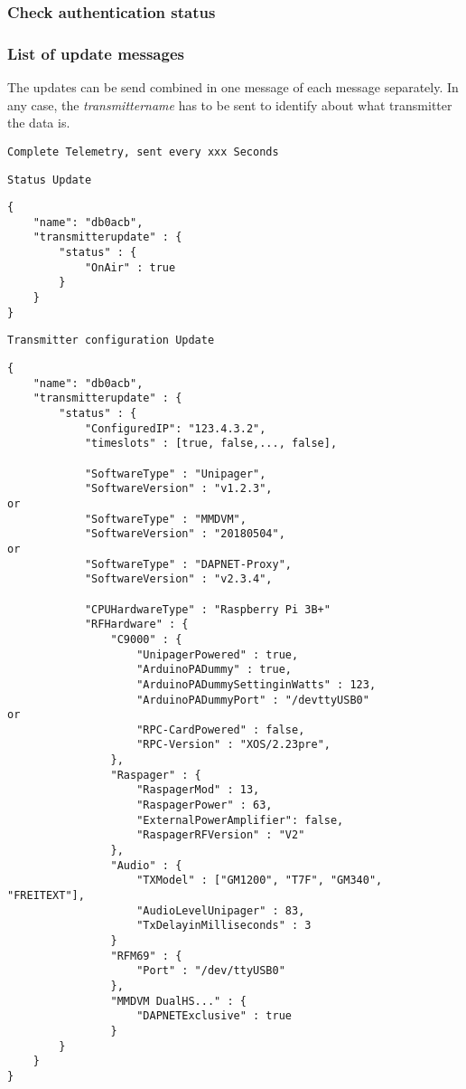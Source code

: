 \documentclass[a4paper]{article}
\begin{document}
\subsubsection{Check authentication status}
 
\subsubsection{List of update messages}
The updates can be send combined in one message of each message separately. In any case, the \textit{transmittername} has to be sent to identify about what transmitter the data is.

\texttt{Complete Telemetry, sent every xxx Seconds}

\texttt{Status Update}
\begin{lstlisting}
{
    "name": "db0acb",
    "transmitterupdate" : {
        "status" : {
            "OnAir" : true
        }
    }
}
\end{lstlisting}

\texttt{Transmitter configuration Update}
\begin{lstlisting}
{
    "name": "db0acb",
	"transmitterupdate" : {
		"status" : {
			"ConfiguredIP": "123.4.3.2",
            "timeslots" : [true, false,...,	false],
            
			"SoftwareType" : "Unipager",
            "SoftwareVersion" : "v1.2.3",
or
			"SoftwareType" : "MMDVM",
			"SoftwareVersion" : "20180504",
or
			"SoftwareType" : "DAPNET-Proxy",
			"SoftwareVersion" : "v2.3.4",
            
			"CPUHardwareType" : "Raspberry Pi 3B+"
			"RFHardware" : {
				"C9000" : {
					"UnipagerPowered" : true,
					"ArduinoPADummy" : true,
					"ArduinoPADummySettinginWatts" : 123,
					"ArduinoPADummyPort" : "/devttyUSB0"
or
					"RPC-CardPowered" : false,
					"RPC-Version" : "XOS/2.23pre",
                },
                "Raspager" : {
                    "RaspagerMod" : 13,
                    "RaspagerPower" : 63,
                    "ExternalPowerAmplifier": false,
                    "RaspagerRFVersion" : "V2"
                },
                "Audio" : {
                    "TXModel" : ["GM1200", "T7F", "GM340", "FREITEXT"],
                    "AudioLevelUnipager" : 83,
                    "TxDelayinMilliseconds" : 3
                }
                "RFM69" : {
                	"Port" : "/dev/ttyUSB0"
                },
                "MMDVM DualHS..." : {
                    "DAPNETExclusive" : true
                }
        }
    }
}
\end{lstlisting}
\end{document}
